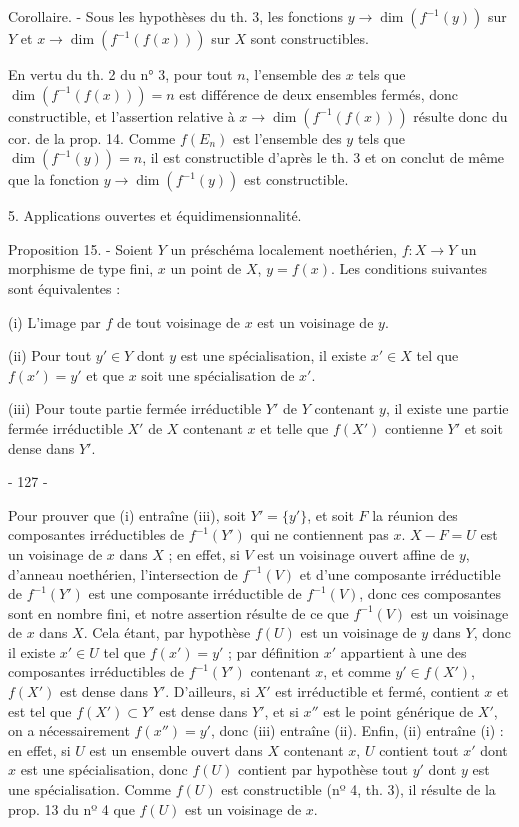 Corollaire. - Sous les hypothèses du th. 3, les fonctions $y \to \dim(f^{-1}(y))$ sur $Y$ et $x \to \dim(f^{-1}(f(x)))$ sur $X$ sont constructibles.

En vertu du th. 2 du n° 3, pour tout $n$, l'ensemble des $x$ tels que $\dim(f^{-1}(f(x))) = n$ est différence de deux ensembles fermés, donc constructible, et l'assertion relative à $x \to \dim(f^{-1}(f(x)))$ résulte donc du cor. de la prop. 14. Comme $f(E_n)$ est l'ensemble des $y$ tels que $\dim(f^{-1}(y)) = n$, il est constructible d'après le th. 3 et on conclut de même que la fonction $y \to \dim(f^{-1}(y))$ est constructible.

5. Applications ouvertes et équidimensionnalité.

Proposition 15. - Soient $Y$ un préschéma localement noethérien, $f: X \to Y$ un morphisme de type fini, $x$ un point de $X$, $y = f(x)$. Les conditions suivantes sont équivalentes :

(i) L'image par $f$ de tout voisinage de $x$ est un voisinage de $y$.

(ii) Pour tout $y' \in Y$ dont $y$ est une spécialisation, il existe $x' \in X$ tel que $f(x') = y'$ et que $x$ soit une spécialisation de $x'$.

(iii) Pour toute partie fermée irréductible $Y'$ de $Y$ contenant $y$, il existe une partie fermée irréductible $X'$ de $X$ contenant $x$ et telle que $f(X')$ contienne $Y'$ et soit dense dans $Y'$.

\newpage


- 127 -

Pour prouver que (i) entraîne (iii), soit $Y' = \{y'\}$, et soit $F$ la réunion des composantes irréductibles de $f^{-1}(Y')$ qui ne contiennent pas $x$. $X - F = U$ est un voisinage de $x$ dans $X$ ; en effet, si $V$ est un voisinage ouvert affine de $y$, d'anneau noethérien, l'intersection de $f^{-1}(V)$ et d'une composante irréductible de $f^{-1}(Y')$ est une composante irréductible de $f^{-1}(V)$, donc ces composantes sont en nombre fini, et notre assertion résulte de ce que $f^{-1}(V)$ est un voisinage de $x$ dans $X$. Cela étant, par hypothèse $f(U)$ est un voisinage de $y$ dans $Y$, donc il existe $x' \in U$ tel que $f(x') = y'$ ; par définition $x'$ appartient à une des composantes irréductibles de $f^{-1}(Y')$ contenant $x$, et comme $y' \in f(X')$, $f(X')$ est dense dans $Y'$. D'ailleurs, si $X'$ est irréductible et fermé, contient $x$ et est tel que $f(X') \subset Y'$ est dense dans $Y'$, et si $x''$ est le point générique de $X'$, on a nécessairement $f(x'') = y'$, donc (iii) entraîne (ii). Enfin, (ii) entraîne (i) : en effet, si $U$ est un ensemble ouvert dans $X$ contenant $x$, $U$ contient tout $x'$ dont $x$ est une spécialisation, donc $f(U)$ contient par hypothèse tout $y'$ dont $y$ est une spécialisation. Comme $f(U)$ est constructible (nº 4, th. 3), il résulte de la prop. 13 du nº 4 que $f(U)$ est un voisinage de $x$.

